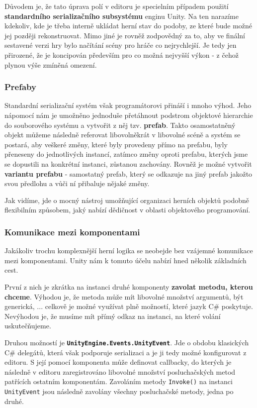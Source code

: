 Důvodem je, že tato úprava polí v editoru je specielním případem použití \textbf{standardního serializačního subsystému} enginu Unity. Na ten narazíme kdekoliv, kde je třeba interně ukládat herní stav do podoby, ze které bude možné jej později rekonstruovat. Mimo jiné je rovněž zodpovědný za to, aby ve finální sestavené verzi hry bylo načítání scény pro hráče co nejrychlejší. Je tedy jen přirozené, že je koncipován především pro co možná nejvyšší výkon - z čehož plynou výše zmíněná omezení.

\subsubsection*{Prefaby}
Standardní serializační systém však programátorovi přináší i mnoho výhod. Jeho nápomocí nám je umožněno jednoduše přetáhnout podstrom objektové hierarchie do souborového systému a vytvořit z něj tzv. \textbf{prefab}. Takto osamostatněný objekt můžeme následně referovat libovolněkrát v libovolné scéně a systém se postará, aby veškeré změny, které byly provedeny přímo na prefabu, byly přeneseny do jednotlivých instancí, zatímco změny oproti prefabu, kterých jsme se dopustili na konkrétní instanci, zůstanou zachovány. Rovněž je možné vytvořit \textbf{variantu prefabu} - samostatný prefab, který se odkazuje na jiný prefab jakožto svou předlohu a vůči ní přibaluje nějaké změny. 

Jak vidíme, jde o mocný nástroj umožňující organizaci herních objektů podobně flexibilním způsobem, jaký nabízí dědičnost v oblasti objektového programování. 

\subsubsection*{Komunikace mezi komponentami} \label{communicationBetweenComponentsSubsubsection}

Jakákoliv trochu komplexnější herní logika se neobejde bez vzájemné komunikace mezi komponentami. Unity nám k tomuto účelu nabízí hned několik základních cest.

První z nich je zkrátka na instanci druhé komponenty \textbf{zavolat metodu, kterou chceme}. Výhodou je, že metoda může mít libovolné množství argumentů, být generická, ... celkově je možné využívat plně možností, které jazyk C\# poskytuje. Nevýhodou je, že musíme mít přímý odkaz na instanci, na které volání uskutečňujeme.

Druhou možností je \textbf{\texttt{UnityEngine.Events.UnityEvent}}. Jde o obdobu klasických C\# delegátů, která však podporuje serializaci a je ji tedy možné konfigurovat z editoru. S její pomocí komponenta může definovat callbacky, do kterých je následně v editoru zaregistrováno libovolné množství posluchačských metod patřících ostatním komponentám. Zavoláním metody \texttt{Invoke()} na instanci \texttt{UnityEvent} jsou následně zavolány všechny posluchačské metody, jedna po druhé.

